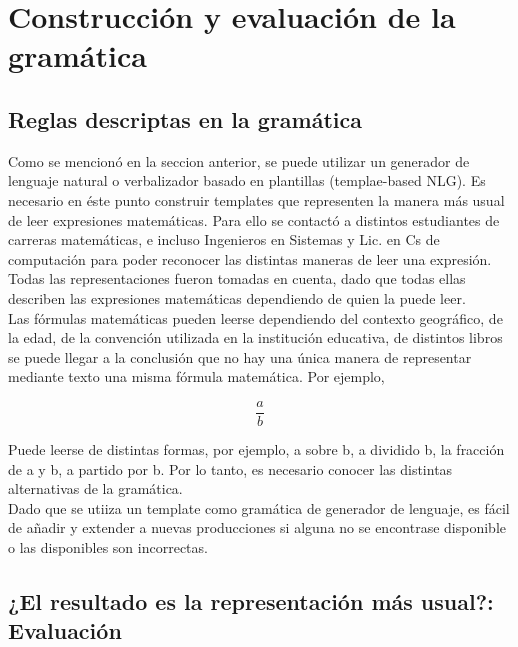 
\chapter{Construcción y evaluación de la gramática}

\label{Chapter4} %


\section{Reglas descriptas en la gramática}

Como se mencionó en la seccion anterior, se puede utilizar un generador de lenguaje natural o verbalizador basado en plantillas (templae-based NLG). Es necesario en éste punto construir templates que representen la manera más usual de leer expresiones matemáticas. Para ello se contactó a distintos estudiantes de carreras matemáticas, e incluso Ingenieros en Sistemas y Lic. en Cs de computación para poder reconocer las distintas maneras de leer una expresión. Todas las representaciones fueron tomadas en cuenta, dado que todas ellas describen las expresiones matemáticas dependiendo de quien la puede leer.\\

Las fórmulas matemáticas pueden leerse dependiendo del contexto geográfico, de la edad, de la convención utilizada en la institución educativa, de distintos libros se puede llegar a la conclusión que no hay una única manera de representar mediante texto una misma fórmula matemática.
Por ejemplo, 

$$\frac{a}{b}$$

Puede leerse de distintas formas, por ejemplo, a sobre b, a dividido b, la fracción de a y b, a partido por b. Por lo tanto, es necesario conocer las distintas alternativas de la gramática.\\

Dado que se utiiza un template como gramática de generador de lenguaje, es fácil de añadir y extender a nuevas producciones si alguna no se encontrase disponible o las disponibles son incorrectas.\\

\section{¿El resultado es la representación más usual?: Evaluación}

